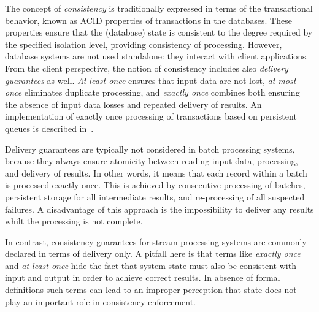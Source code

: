 \label{fs-preliminaries}

The concept of {\em consistency} is traditionally expressed in terms of the transactional behavior, known as ACID properties of transactions in the databases. 
 These properties ensure that the (database) state is consistent to the degree required by the specified isolation level, providing consistency of processing. 
 However, database systems are not used standalone: they  	interact  with client applications.
  From the client perspective,   the notion of consistency includes also  {\em delivery guarantees} as well. {\em At least once}  ensures that input data are not lost, {\em at most once} eliminates duplicate processing, and {\em exactly once} combines both ensuring the absence of input data losses and repeated delivery of results. An implementation of exactly once processing of transactions based on persistent queues is described in~\cite{DBLP:books/mk/WeikumV2002}.



Delivery guarantees are typically not considered in batch processing systems, because they always ensure atomicity between reading input data, processing, and delivery of results. In other words, it means that each record within a batch is processed exactly once. This is achieved by consecutive processing of batches, persistent storage for all intermediate results, and re-processing of all suspected failures. 
A disadvantage of this approach is the impossibility to deliver any results whilt the processing is not complete.

In contrast,   consistency guarantees   for  stream processing systems   are commonly declared in terms of delivery only. 
A pitfall here is that terms like {\em exactly once} and {\em at least once} hide the fact that system state must also be consistent with input and output in order to achieve correct results. 
In absence of formal definitions such terms  can lead to an improper perception that state does not play an important role in consistency enforcement. 

